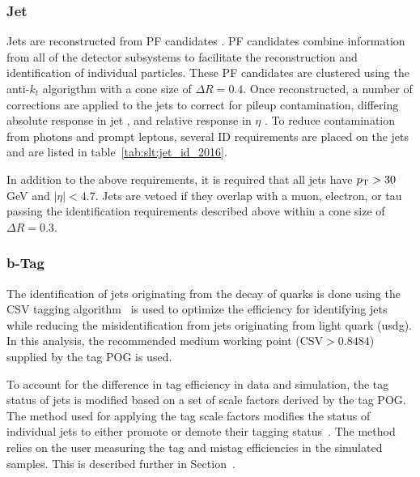 \subsubsection{Jet}
Jets are reconstructed from PF candidates \cite{ref:pf}. PF candidates combine information from all of the detector subsystems to facilitate the reconstruction and identification of individual particles.  These PF candidates are clustered using the anti-$k_{t}$ algorigthm \cite{Cacciari:2008gp} with a cone size of $\Delta R = 0.4$. Once reconstructed, a number of corrections are applied to the jets to correct for pileup contamination, differing absolute response in jet \pt, and relative response in $\eta$ \cite{ref:jetscale}.  To reduce contamination from photons and prompt leptons, several ID requirements are placed on the jets and are listed in table~\ref{tab:slt:jet_id_2016}.



\noindent In addition to the above requirements, it is required that all jets have $p_{\mathrm{T}} > 30$ GeV and $\left|\eta\right| < 4.7$.  Jets are vetoed if they overlap with a muon, electron, or tau passing the identification requirements described above within a cone size of $\Delta R = 0.3$. 

\subsubsection{b-Tag} The identification of jets originating from the decay of \PQb quarks is done using the CSV \PQb tagging algorithm~\cite{Sirunyan:2298594} is used to optimize the efficiency for identifying \PQb jets while reducing the misidentification from jets originating from light quark (usdg).  In this analysis, the recommended medium working point ($\text{CSV} > 0.8484$) supplied by the \PQb tag POG is used.  

To account for the difference in \PQb tag efficiency in data and simulation, the \PQb tag status of jets is modified based on a set of scale factors derived by the \PQb tag POG.  The method used for applying the \PQb tag scale factors modifies the status of individual jets to either promote or demote their \PQb tagging status~\cite{twiki:btag_method}.  The method relies on the user measuring the \PQb tag and mistag efficiencies in the simulated samples.  This is described further in Section~\label{sec:app:btag}.


\FloatBarrier

